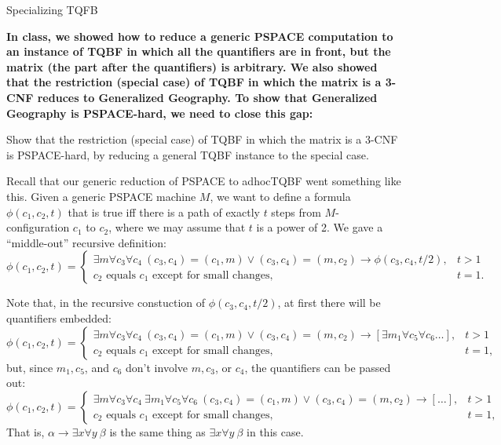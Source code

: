 \documentclass[2pt]{scrartcl}
\makeatletter
\renewcommand{\subsubsection}{\@startsection{subsubsection}{3}{0mm}
  {-1ex plus -.5ex minus -.2ex}
  {1ex plus .2ex}
{\normalfont\small\bfseries}}
\makeatother
\begin{document}
\begin{multicols}{6}
        \subsubsection{Specializing TQFB}
            {\bf In class, we showed how to reduce a generic PSPACE computation to an
instance of TQBF in which all the quantifiers are in front, but the
matrix (the part after the quantifiers) is arbitrary.  We also showed
that the restriction (special case) of TQBF in which the matrix is a
3-CNF reduces to Generalized Geography.  To show that Generalized
Geography is PSPACE-hard, we need to close this gap:

Show that the restriction (special case) of TQBF in which the matrix
is a 3-CNF is PSPACE-hard, by reducing a general TQBF instance to the
special case.}

            Recall that our generic reduction of PSPACE to adhocTQBF went
something like this.  Given a generic PSPACE machine $M$, we want to
define a formula $\phi(c_1,c_2,t)$ that is true iff there is a path of
exactly $t$ steps from $M$-configuration $c_1$ to $c_2$, where we may
assume that $t$ is a power of 2.  We gave a ``middle-out'' recursive
definition:
\[\phi(c_1,c_2,t)=
\left\{
\begin{array}{ll}
\exists m\forall c_3\forall c_4\>
(c_3,c_4)=(c_1,m)\lor(c_3,c_4)=(m,c_2)\to\phi(c_3,c_4,t/2), & t > 1\\
\mbox{$c_2$ equals $c_1$ except for small changes}, & t = 1.
\end{array}
\right.
\]

Note that, in the recursive constuction of $\phi(c_3,c_4,t/2)$, at
first there will be quantifiers embedded:
\[\phi(c_1,c_2,t)=
\left\{
\begin{array}{ll}
\exists m\forall c_3\forall c_4\>
(c_3,c_4)=(c_1,m)\lor(c_3,c_4)=(m,c_2)\to\left[\exists m_1\forall
  c_5\forall c_6\ldots\right], & t > 1\\
\mbox{$c_2$ equals $c_1$ except for small changes}, & t = 1,
\end{array}
\right.
\]
but, since $m_1,c_5$, and $c_6$ don't involve $m,c_3$, or $c_4$, the
quantifiers can be passed out:
\[\phi(c_1,c_2,t)=
\left\{
\begin{array}{ll}
\exists m\forall c_3\forall c_4\>\exists m_1\forall
  c_5\forall c_6\>
(c_3,c_4)=(c_1,m)\lor(c_3,c_4)=(m,c_2)\to\left[\ldots\right], & t > 1\\
\mbox{$c_2$ equals $c_1$ except for small changes}, & t = 1,
\end{array}
\right.
\]
That is, $\alpha\to\exists x\forall y\> \beta$ is the same thing as
$\exists x\forall y\>\beta$ in this case.


\end{multicols}
\end{document}
